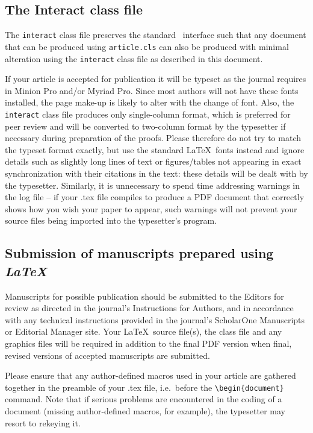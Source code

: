 \documentclass[]{interact}
\theoremstyle{plain}%
\theoremstyle{definition}
\theoremstyle{remark}
\begin{document}
\subsection{The \textsf{Interact} class file}\label{class}

The \texttt{interact} class file preserves the standard \LaTeXe\ interface such that any document that can be produced using \texttt{article.cls} can also be produced with minimal alteration using the \texttt{interact} class file as described in this document.

If your article is accepted for publication it will be typeset as the journal requires in Minion Pro and/or Myriad Pro. Since most authors will not have these fonts installed, the page make-up is likely to alter with the change of font. Also, the \texttt{interact} class file produces only single-column format, which is preferred for peer review and will be converted to two-column format by the typesetter if necessary during preparation of the proofs. Please therefore do not try to match the typeset format exactly, but use the standard \LaTeX\ fonts instead and ignore details such as slightly long lines of text or figures/tables not appearing in exact synchronization with their citations in the text: these details will be dealt with by the typesetter. Similarly, it is unnecessary to spend time addressing warnings in the log file -- if your .tex file compiles to produce a PDF document that correctly shows how you wish your paper to appear, such warnings will not prevent your source files being imported into the typesetter's program.


\subsection{Submission of manuscripts prepared using \emph{\LaTeX}}

Manuscripts for possible publication should be submitted to the Editors for review as directed in the journal's Instructions for Authors, and in accordance with any technical instructions provided in the journal's ScholarOne Manuscripts or Editorial Manager site. Your \LaTeX\ source file(s), the class file and any graphics files will be required in addition to the final PDF version when final, revised versions of accepted manuscripts are submitted.

Please ensure that any author-defined macros used in your article are gathered together in the preamble of your .tex file, i.e.\ before the \verb"\begin{document}" command. Note that if serious problems are encountered in the coding of a document (missing author-defined macros, for example), the typesetter may resort to rekeying it.
\end{document}
